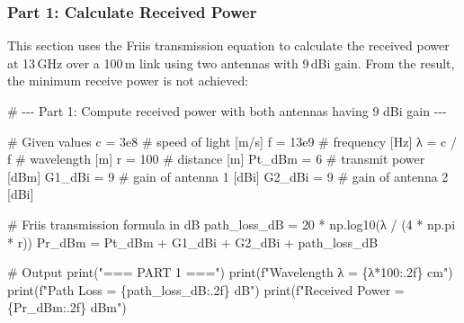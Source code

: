 \documentclass[
  letterpaper,
  DIV=11,
  numbers=noendperiod]{scrartcl}
\newenvironment{Shaded}{\begin{snugshade}}{\end{snugshade}}
\newcommand{\BuiltInTok}[1]{\textcolor[rgb]{0.00,0.23,0.31}{#1}}
\newcommand{\CommentTok}[1]{\textcolor[rgb]{0.37,0.37,0.37}{#1}}
\newcommand{\DecValTok}[1]{\textcolor[rgb]{0.68,0.00,0.00}{#1}}
\newcommand{\FloatTok}[1]{\textcolor[rgb]{0.68,0.00,0.00}{#1}}
\newcommand{\NormalTok}[1]{\textcolor[rgb]{0.00,0.23,0.31}{#1}}
\newcommand{\OperatorTok}[1]{\textcolor[rgb]{0.37,0.37,0.37}{#1}}
\newcommand{\SpecialCharTok}[1]{\textcolor[rgb]{0.37,0.37,0.37}{#1}}
\newcommand{\SpecialStringTok}[1]{\textcolor[rgb]{0.13,0.47,0.30}{#1}}
\newcommand{\StringTok}[1]{\textcolor[rgb]{0.13,0.47,0.30}{#1}}
\begin{document}
\subsubsection{Part 1: Calculate Received
Power}\label{part-1-calculate-received-power}

This section uses the Friis transmission equation to calculate the
received power at 13\,GHz over a 100\,m link using two antennas with
9\,dBi gain. From the result, the minimum receive power is not achieved:

\begin{Shaded}
\begin{Highlighting}[]
\CommentTok{\# {-}{-}{-} Part 1: Compute received power with both antennas having 9 dBi gain {-}{-}{-}}

\CommentTok{\# Given values}
\NormalTok{c }\OperatorTok{=} \FloatTok{3e8}  \CommentTok{\# speed of light [m/s]}
\NormalTok{f }\OperatorTok{=} \FloatTok{13e9}  \CommentTok{\# frequency [Hz]}
\NormalTok{λ }\OperatorTok{=}\NormalTok{ c }\OperatorTok{/}\NormalTok{ f  }\CommentTok{\# wavelength [m]}
\NormalTok{r }\OperatorTok{=} \DecValTok{100}  \CommentTok{\# distance [m]}
\NormalTok{Pt\_dBm }\OperatorTok{=} \DecValTok{6}  \CommentTok{\# transmit power [dBm]}
\NormalTok{G1\_dBi }\OperatorTok{=} \DecValTok{9}  \CommentTok{\# gain of antenna 1 [dBi]}
\NormalTok{G2\_dBi }\OperatorTok{=} \DecValTok{9}  \CommentTok{\# gain of antenna 2 [dBi]}

\CommentTok{\# Friis transmission formula in dB}
\NormalTok{path\_loss\_dB }\OperatorTok{=} \DecValTok{20} \OperatorTok{*}\NormalTok{ np.log10(λ }\OperatorTok{/}\NormalTok{ (}\DecValTok{4} \OperatorTok{*}\NormalTok{ np.pi }\OperatorTok{*}\NormalTok{ r))}
\NormalTok{Pr\_dBm }\OperatorTok{=}\NormalTok{ Pt\_dBm }\OperatorTok{+}\NormalTok{ G1\_dBi }\OperatorTok{+}\NormalTok{ G2\_dBi }\OperatorTok{+}\NormalTok{ path\_loss\_dB}

\CommentTok{\# Output}
\BuiltInTok{print}\NormalTok{(}\StringTok{"=== PART 1 ==="}\NormalTok{)}
\BuiltInTok{print}\NormalTok{(}\SpecialStringTok{f"Wavelength λ = }\SpecialCharTok{\{λ}\OperatorTok{*}\DecValTok{100}\SpecialCharTok{:.2f\}}\SpecialStringTok{ cm"}\NormalTok{)}
\BuiltInTok{print}\NormalTok{(}\SpecialStringTok{f"Path Loss = }\SpecialCharTok{\{}\NormalTok{path\_loss\_dB}\SpecialCharTok{:.2f\}}\SpecialStringTok{ dB"}\NormalTok{)}
\BuiltInTok{print}\NormalTok{(}\SpecialStringTok{f"Received Power = }\SpecialCharTok{\{}\NormalTok{Pr\_dBm}\SpecialCharTok{:.2f\}}\SpecialStringTok{ dBm"}\NormalTok{)}
\end{Highlighting}
\end{Shaded}
\end{document}
